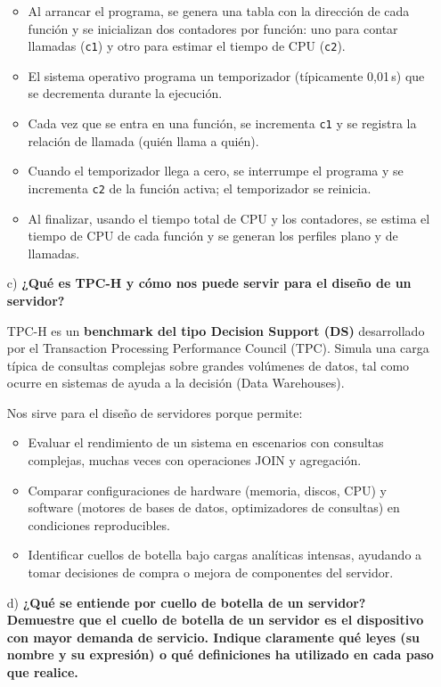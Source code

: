 \documentclass[a4paper,12pt]{article}
\begin{document}
\begin{enumerate}
    \begin{itemize}
        \item Al arrancar el programa, se genera una tabla con la dirección de cada función y se inicializan dos contadores por función: uno para contar llamadas (\texttt{c1}) y otro para estimar el tiempo de CPU (\texttt{c2}).
        \item El sistema operativo programa un temporizador (típicamente 0,01\,s) que se decrementa durante la ejecución.
        \item Cada vez que se entra en una función, se incrementa \texttt{c1} y se registra la relación de llamada (quién llama a quién).
        \item Cuando el temporizador llega a cero, se interrumpe el programa y se incrementa \texttt{c2} de la función activa; el temporizador se reinicia.
        \item Al finalizar, usando el tiempo total de CPU y los contadores, se estima el tiempo de CPU de cada función y se generan los perfiles plano y de llamadas.
    \end{itemize}
    \item[c)] \textbf{¿Qué es TPC-H y cómo nos puede servir para el diseño de un servidor?}

    TPC-H es un \textbf{benchmark del tipo Decision Support (DS)} desarrollado por el Transaction Processing Performance Council (TPC). Simula una carga típica de consultas complejas sobre grandes volúmenes de datos, tal como ocurre en sistemas de ayuda a la decisión (Data Warehouses).

    Nos sirve para el diseño de servidores porque permite:
    \begin{itemize}
        \item Evaluar el rendimiento de un sistema en escenarios con consultas complejas, muchas veces con operaciones JOIN y agregación.
        \item Comparar configuraciones de hardware (memoria, discos, CPU) y software (motores de bases de datos, optimizadores de consultas) en condiciones reproducibles.
        \item Identificar cuellos de botella bajo cargas analíticas intensas, ayudando a tomar decisiones de compra o mejora de componentes del servidor.
    \end{itemize}

    \item[d)] \textbf{¿Qué se entiende por cuello de botella de un servidor? Demuestre que el cuello de botella de un servidor es el dispositivo con mayor demanda de servicio. Indique claramente qué leyes (su nombre y su expresión) o qué definiciones ha utilizado en cada paso que realice.}


\end{enumerate}
\end{document}
